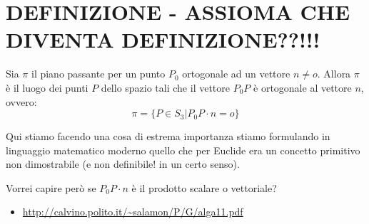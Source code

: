 \section{DEFINIZIONE - ASSIOMA CHE DIVENTA DEFINIZIONE??!!!}
\begin{definizione}
Sia $\pi$ il piano passante per un punto $P_0$ ortogonale ad un vettore $n \ne o$. Allora $\pi$ è il luogo
dei punti $P$ dello spazio tali che il vettore $P_0P$ è ortogonale al vettore $n$, ovvero:
\[
 \pi = \{ P \in S_3 | P_0P \cdot n = o  \} 
\]
\end{definizione}

\begin{osservazione}
Qui stiamo facendo una cosa di estrema importanza stiamo formulando in linguaggio matematico moderno quello che per Euclide era un
concetto primitivo non dimostrabile (e non definibile! in un certo senso).

Vorrei capire però se $P_0P \cdot n$ è il prodotto scalare o vettoriale?

\end{osservazione}

\begin{osservazione}
\begin{itemize}
 \item \url{http://calvino.polito.it/~salamon/P/G/alga11.pdf}
\end{itemize}
\end{osservazione}

